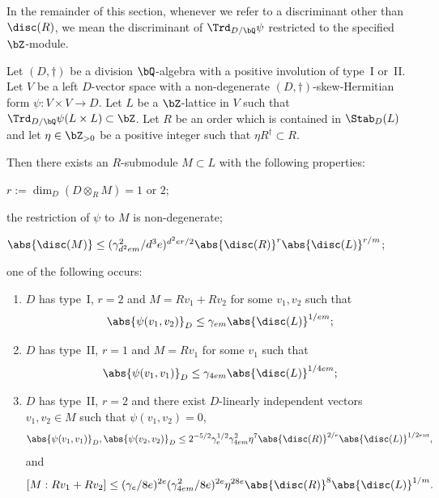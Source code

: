 In the remainder of this section, whenever we refer to a discriminant other than $\disc(R)$, we mean the discriminant of $\Trd_{D/\bQ} \psi$ restricted to the specified $\bZ$-module.

\begin{lemma} \label{pre-induction}
Let $(D,\dag)$ be a division $\bQ$-algebra with a positive involution of type~I or~II.
Let $V$ be a left $D$-vector space with a non-degenerate $(D,\dag)$-skew-Hermitian form $\psi \colon V \times V \to D$.
Let $L$ be a $\bZ$-lattice in $V$ such that $\Trd_{D/\bQ} \psi(L \times L) \subset \bZ$.
Let $R$ be an order which is contained in $\Stab_D(L)$ and let $\eta \in \bZ_{>0}$ be a positive integer such that $\eta R^\dag \subset R$.

Then there exists an $R$-submodule $M \subset L$ with the following properties:
\begin{enumeratei}
\item\label{pre-inductioni} $r := \dim_D(D \otimes_R M) = 1$ or $2$;
\item\label{pre-inductionii} the restriction of $\psi$ to $M$ is non-degenerate;
\item\label{pre-inductioniii} $\abs{\disc(M)} \leq (\gamma_{d^2em}^2/d^3e)^{d^2er/2} \abs{\disc(R)}^r \abs{\disc(L)}^{r/m}$;
\item\label{pre-inductioniv} one of the following occurs:
\begin{enumerate}
\item $D$ has type~I, $r=2$ and $M = Rv_1 + Rv_2$ for some $v_1, v_2$ such that\vspace*{-3pt}
\[
\abs{\psi(v_1, v_2)}_D \leq \gamma_{em} \abs{\disc(L)}^{1/em};
\]
\item $D$ has type~II, $r=1$ and $M = Rv_1$ for some $v_1$ such that\vspace*{-3pt}
\[
\abs{\psi(v_1, v_1)}_D \leq \gamma_{4em} \abs{\disc(L)}^{1/4em};
\]
\item $D$ has type~II, $r=2$ and there exist $D$-linearly independent vectors $v_1, v_2 \in M$ such that $\psi(v_1, v_2) = 0$,\vspace*{-3pt}\enlargethispage{\baselineskip}
\[
\abs{\psi(v_1, v_1)}_D, \abs{\psi(v_2, v_2)}_D \leq 2^{-5/2} \gamma_e^{1/2} \gamma_{4em}^2 \eta^7 \abs{\disc(R)}^{2/e} \abs{\disc(L)}^{1/2em},
\]
and\vspace*{-5pt}
\[
[M:Rv_1 + Rv_2] \leq (\gamma_e/8e)^{2e} (\gamma_{4em}^2/8e)^{2e} \eta^{28e} \abs{\disc(R)}^8 \abs{\disc(L)}^{1/m}.
\]
\end{enumerate}
\end{enumeratei}
\end{lemma}

